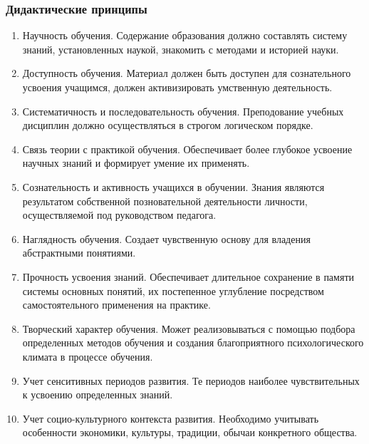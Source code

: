\subsubsection{Дидактические принципы}
\begin{enumerate}
	\item Научность обучения. Содержание образования должно составлять систему знаний, установленных наукой, знакомить с методами и историей науки.
	\item Доступность обучения. Материал должен быть доступен для сознательного усвоения учащимся, должен активизировать умственную деятельность.
	\item Систематичность и последовательность обучения. Преподование учебных дисциплин должно осуществляться в строгом логическом порядке.
	\item Связь теории с практикой обучения. Обеспечивает более глубокое усвоение научных знаний и формирует умение их применять.
	\item Сознательность и активность учащихся в обучении. Знания являются результатом собственной позновательной деятельности личности, осуществляемой под руководством педагога.
	\item Наглядность обучения. Создает чувственную основу для владения абстрактными понятиями.
	\item Прочность усвоения знаний. Обеспечивает длительное сохранение в памяти системы основных понятий, их постепенное углубление посредством самостоятельного применения на практике.
	\item Творческий характер обучения. Может реализовываться с помощью подбора определенных методов обучения и создания благоприятного психологического климата в процессе обучения.
	\item Учет сенситивных периодов развития. Те периодов наиболее чувствительных к усвоению определенных знаний.
	\item Учет социо-культурного контекста развития. Необходимо учитывать особенности экономики, культуры, традиции, обычаи конкретного общества.
\end{enumerate}

